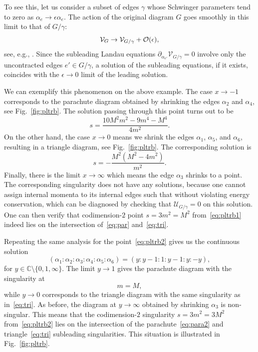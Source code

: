 \documentclass[12pt]{article}
\numberwithin{figure}{section}
\def \be {\begin{equation}}
\def \ee {\end{equation}}
\def \C {\mathbb{C}}
\def \U {\mathcal{U}}
\def \V {\mathcal{V}}
\begin{document}
				To see this, let us consider a subset of edges $\gamma$ whose Schwinger parameters tend to zero as $\alpha_e \to \epsilon \alpha_e$. The action of the original diagram $G$ goes smoothly in this limit to that of $G/\gamma$:
				\be
				\V_G \to \V_{G/\gamma} + {\cal O}(\epsilon),
				\ee
				see, e.g., \cite[Sec.~4.2]{Mizera:2021icv}. Since the subleading Landau equations $\partial_{\alpha_{e'}}\V_{G/\gamma} = 0$ involve only the uncontracted edges $e' \in G/\gamma$, a solution of the subleading equations, if it exists, coincides with the $\epsilon\to0$ limit of the leading solution.
				
				We can exemplify this phenomenon on the above example. The case $x \to -1$ corresponds to the parachute diagram obtained by shrinking the edges $\alpha_2$ and $\alpha_4$, see Fig.~\ref{fig:pltrb}. The solution passing through this point turns out to be \cite{Mizera:2021icv}
				\be\label{eq:par}
				s = \frac{10M^2 m^2 - 9m^4 - M^4}{4m^2}.
				\ee
				On the other hand, the case $x \to 0$ means we shrink the edges $\alpha_1$, $\alpha_5$, and $\alpha_6$, resulting in a triangle diagram, see Fig.~\ref{fig:pltrb}. The corresponding solution is
				\be\label{eq:tri}
				s = - \frac{M^2 (M^2 - 4 m^2)}{m^2}.
				\ee
				Finally, there is the limit $x\to \infty$ which means the edge $\alpha_3$ shrinks to a point. The corresponding singularity does not have any solutions, because one cannot assign internal momenta to its internal edges such that without violating energy conservation, which can be diagnosed by checking that $\U_{G/\gamma}=0$ on this solution.
			    One can then verify that codimension-$2$ point $s = 3m^2 = M^2$ from~\eqref{eq:pltrb1} indeed lies on the intersection of~\eqref{eq:par} and~\eqref{eq:tri}.
				
				Repeating the same analysis for the point~\eqref{eq:pltrb2} gives us the continuous solution
				\be
				(\alpha_1 : \alpha_2 : \alpha_3 : \alpha_4 : \alpha_5 : \alpha_6) = (y : y{-}1 : 1 : y{-}1 : y : -y),
				\ee
				for $y \in \C \setminus \{0,1,\infty\}$. The limit $y \to 1$ gives the parachute diagram with the singularity at
				\be\label{eq:para2}
				m=M,
				\ee
				while $y \to 0$ corresponds to the triangle diagram with the same singularity as in~\eqref{eq:tri}. As before, the diagram at $y\to \infty$ obtained by shrinking $\alpha_3$ is non-singular. This means that the codimension-$2$ singularity $s = 3m^2 = 3M^2$ from~\eqref{eq:pltrb2} lies on the intersection of the parachute~\eqref{eq:para2} and triangle~\eqref{eq:tri} subleading singularities. This situation is illustrated in Fig.~\ref{fig:pltrb}.
				
\end{document}
